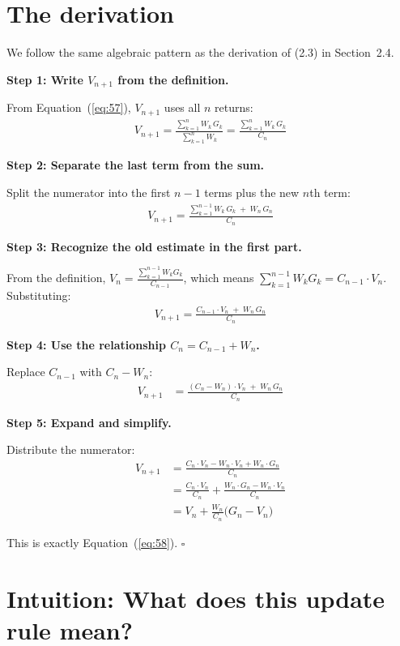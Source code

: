 \documentclass[11pt]{article}
\begin{document}
\section*{The derivation}

We follow the same algebraic pattern as the derivation of (2.3) in Section~2.4.

\textbf{Step 1: Write $V_{n+1}$ from the definition.}

From Equation~(\ref{eq:57}), $V_{n+1}$ uses all $n$ returns:
\begin{align}
    V_{n+1} = \frac{\sum_{k=1}^{n} W_k \, G_k}{\sum_{k=1}^{n} W_k} = \frac{\sum_{k=1}^{n} W_k \, G_k}{C_n}
\end{align}

\textbf{Step 2: Separate the last term from the sum.}

Split the numerator into the first $n - 1$ terms plus the new $n$th term:
\begin{align}
    V_{n+1} = \frac{\sum_{k=1}^{n-1} W_k \, G_k \;+\; W_n \, G_n}{C_n}
\end{align}

\textbf{Step 3: Recognize the old estimate in the first part.}

From the definition, $V_n = \frac{\sum_{k=1}^{n-1} W_k G_k}{C_{n-1}}$, which means $\sum_{k=1}^{n-1} W_k G_k = C_{n-1} \cdot V_n$. Substituting:
\begin{align}
    V_{n+1} = \frac{C_{n-1} \cdot V_n \;+\; W_n \, G_n}{C_n}
\end{align}

\textbf{Step 4: Use the relationship $C_n = C_{n-1} + W_n$.}

Replace $C_{n-1}$ with $C_n - W_n$:
\begin{align}
    V_{n+1} &= \frac{(C_n - W_n) \cdot V_n \;+\; W_n \, G_n}{C_n}
\end{align}

\textbf{Step 5: Expand and simplify.}

Distribute the numerator:
\begin{align}
    V_{n+1} &= \frac{C_n \cdot V_n - W_n \cdot V_n + W_n \cdot G_n}{C_n} \\[6pt]
    &= \frac{C_n \cdot V_n}{C_n} + \frac{W_n \cdot G_n - W_n \cdot V_n}{C_n} \\[6pt]
    &= V_n + \frac{W_n}{C_n}\big(G_n - V_n\big)
\end{align}

This is exactly Equation~(\ref{eq:58}). $\square$

\section*{Intuition: What does this update rule mean?}
\end{document}
